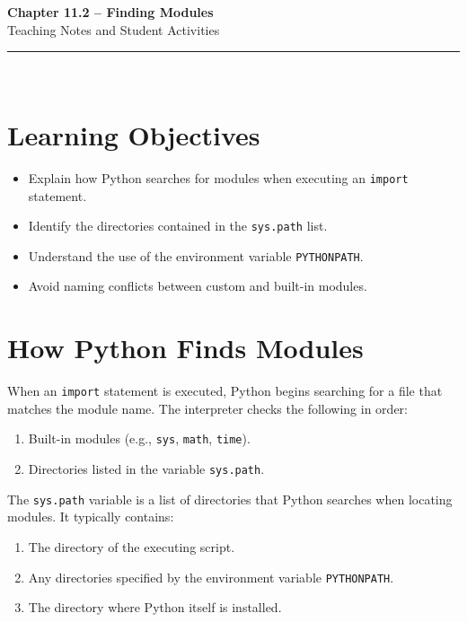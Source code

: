 \documentclass[12pt]{article}
\begin{document}
\begin{center}
  \vspace*{1cm}
  {\Huge \textbf{Chapter 11.2 – Finding Modules}}\\[0.5cm]
  {\Large Teaching Notes and Student Activities}\\[1cm]
  \rule{\textwidth}{0.4pt}\\[1cm]
\end{center}

\section{Learning Objectives}
\begin{itemize}
  \item Explain how Python searches for modules when executing an \texttt{import} statement.
  \item Identify the directories contained in the \texttt{sys.path} list.
  \item Understand the use of the environment variable \texttt{PYTHONPATH}.
  \item Avoid naming conflicts between custom and built-in modules.
\end{itemize}

\section{How Python Finds Modules}

When an \texttt{import} statement is executed, Python begins searching for a file that matches the module name. The interpreter checks the following in order:

\begin{enumerate}
  \item Built-in modules (e.g., \texttt{sys}, \texttt{math}, \texttt{time}).  
  \item Directories listed in the variable \texttt{sys.path}.
\end{enumerate}

The \texttt{sys.path} variable is a list of directories that Python searches when locating modules.  
It typically contains:
\begin{enumerate}[label=\arabic*.]
  \item The directory of the executing script.  
  \item Any directories specified by the environment variable \texttt{PYTHONPATH}.  
  \item The directory where Python itself is installed.
\end{enumerate}
\end{document}

